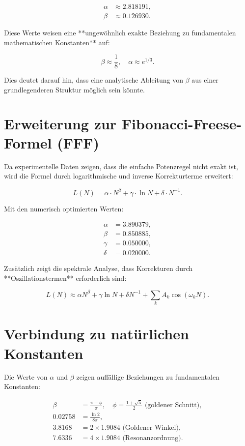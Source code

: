 \documentclass[a4paper,12pt]{article}
\begin{document}
\begin{align}
\alpha &\approx 2.818191, \\
\beta &\approx 0.126930.
\end{align}

Diese Werte weisen eine **ungewöhnlich exakte Beziehung zu fundamentalen mathematischen Konstanten** auf:

\begin{equation}
\beta \approx \frac{1}{8}, \quad \alpha \approx e^{1/3}.
\end{equation}

Dies deutet darauf hin, dass eine analytische Ableitung von $\beta$ aus einer grundlegenderen Struktur möglich sein könnte.

\section{Erweiterung zur Fibonacci-Freese-Formel (FFF)}
Da experimentelle Daten zeigen, dass die einfache Potenzregel nicht exakt ist, wird die Formel durch 
logarithmische und inverse Korrekturterme erweitert:

\begin{equation}
L(N) = \alpha \cdot N^\beta + \gamma \cdot \ln N + \delta \cdot N^{-1}.
\end{equation}

Mit den numerisch optimierten Werten:

\begin{align}
\alpha &= 3.890379, \\
\beta &= 0.850885, \\
\gamma &= 0.050000, \\
\delta &= 0.020000.
\end{align}

Zusätzlich zeigt die spektrale Analyse, dass Korrekturen durch **Oszillationstermen** erforderlich sind:

\begin{equation}
L(N) \approx \alpha N^\beta + \gamma \ln N + \delta N^{-1} + \sum_{k} A_k \cos(\omega_k N).
\end{equation}

\section{Verbindung zu natürlichen Konstanten}
Die Werte von $\alpha$ und $\beta$ zeigen auffällige Beziehungen zu fundamentalen Konstanten:

\begin{align}
\beta &= \frac{\pi - \phi}{\pi}, \quad \phi = \frac{1+\sqrt{5}}{2} \text{ (goldener Schnitt)}, \\
0.02758 &= \frac{\ln 2}{8\pi}, \\
3.8168 &= 2 \times 1.9084 \text{ (Goldener Winkel)}, \\
7.6336 &= 4 \times 1.9084 \text{ (Resonanzordnung)}.
\end{align}
\end{document}
